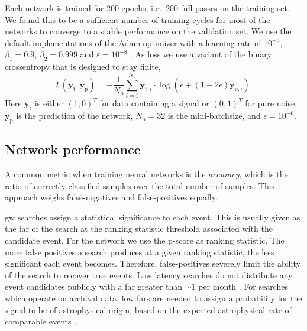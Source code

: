 Each network is trained for 200 epochs, i.e.\ 200 full passes on the training set. We found this to be a sufficient number of training cycles for most of the networks to converge to a stable performance on the validation set. We use the default implementations of the Adam optimizer with a learning rate of $10^{-5}$, $\beta_1 = 0.9$, $\beta_2 = 0.999$ and $\varepsilon = 10^{-8}$ \cite{Kingma:2014aaa}. As loss we use a variant of the binary crossentropy that is designed to stay finite,
\begin{equation}
    L(\bm{y}_\text{t}, \bm{y}_\text{p}) = -\frac{1}{N_\text{b}}\sum_{i=1}^{N_\text{b}} \bm{y}_{\text{t},i}\cdot\log\left(\epsilon + (1 - 2 \epsilon) \bm{y}_{\text{p},i}\right).
\end{equation}
Here $\bm{y}_\text{t}$ is either $(1, 0)^T$ for data containing a signal or $(0, 1)^T$ for pure noise, $\bm{y}_\text{p}$ is the prediction of the network, $N_\text{b}=32$ is the mini-batchsize, and $\epsilon = 10^{-6}$.

\subsection{Network performance}\label{sec:methods:network_performance}
A common metric when training neural networks is the \textit{accuracy}, which is the ratio of correctly classified samples over the total number of samples. This approach weighs false-negatives and false-positives equally.

\acrshort{gw} searches assign a statistical significance to each event. This is usually given as the \acrshort{far} of the search at the ranking statistic threshold associated with the candidate event. For the network we use the p-score as ranking statistic. The more false positives a search produces at a given ranking statistic, the less significant each event becomes. Therefore, false-positives severely limit the ability of the search to recover true events. Low latency searches do not distribute any event candidates publicly with a \acrshort{far} greater than $\sim1$ per month \cite{Nitz:2018rgo}. For searches which operate on archival data, low \acrshort{far}s are needed to assign a probability for the signal to be of astrophysical origin, based on the expected astrophysical rate of comparable events \cite{LIGOScientific:2020ibl,Nitz:2021uxj}.

